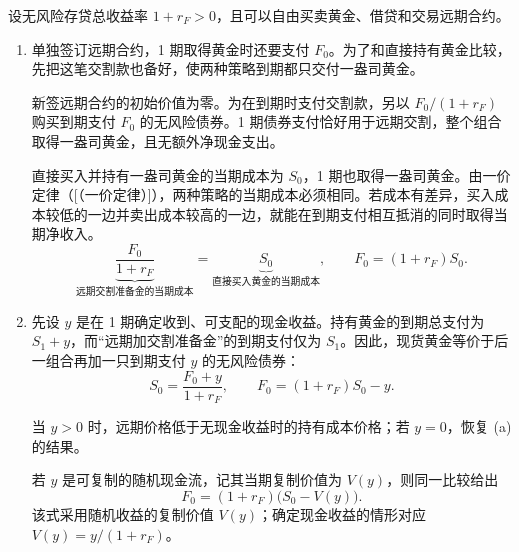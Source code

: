 \begin{solution}[blank-type=manual,blank-vsep=9\baselineskip]
设无风险存贷总收益率 $1+r_F>0$，且可以自由买卖黄金、借贷和交易远期合约。
\begin{enumerate}[label=(\alph*)]
    \item 单独签订远期合约，1 期取得黄金时还要支付 $F_0$。为了和直接持有黄金比较，先把这笔交割款也备好，使两种策略到期都只交付一盎司黄金。

    新签远期合约的初始价值为零。为在到期时支付交割款，另以 $F_0/(1+r_F)$ 购买到期支付 $F_0$ 的无风险债券。1 期债券支付恰好用于远期交割，整个组合取得一盎司黄金，且无额外净现金支出。

    直接买入并持有一盎司黄金的当期成本为 $S_0$，1 期也取得一盎司黄金。由一价定律\ifdefined\WJHandoutKnowledge（[（一价定律）]）\fi，两种策略的当期成本必须相同。若成本有差异，买入成本较低的一边并卖出成本较高的一边，就能在到期支付相互抵消的同时取得当期净收入。
    \[
       \underbrace{\frac{F_0}{1+r_F}}_{\text{远期交割准备金的当期成本}}
       =\underbrace{S_0}_{\text{直接买入黄金的当期成本}},\qquad
       F_0=(1+r_F)S_0.
    \]

    \item 先设 $y$ 是在 1 期确定收到、可支配的现金收益。持有黄金的到期总支付为 $S_1+y$，而“远期加交割准备金”的到期支付仅为 $S_1$。因此，现货黄金等价于后一组合再加一只到期支付 $y$ 的无风险债券：
    \[
       S_0=\frac{F_0+y}{1+r_F},\qquad
       F_0=(1+r_F)S_0-y.
    \]

    当 $y>0$ 时，远期价格低于无现金收益时的持有成本价格；若 $y=0$，恢复 (a) 的结果。

    若 $y$ 是可复制的随机现金流，记其当期复制价值为 $V(y)$，则同一比较给出
    \[
       F_0=(1+r_F)\bigl(S_0-V(y)\bigr).
    \]
    该式采用随机收益的复制价值 $V(y)$；确定现金收益的情形对应 $V(y)=y/(1+r_F)$。
\end{enumerate}
\end{solution}

